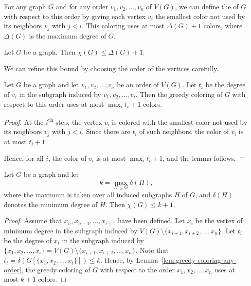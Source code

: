 For any graph \(G\) and for any order \(v_1, v_2, \ldots, v_n\) of \(V(G)\), we can define the  of \(G\) with respect to this order by giving each vertex \(v_i\) the smallest color not used by its neighbors \(v_j\) with \(j < i\).
This coloring uses at most \(\Delta(G) + 1\) colors,
where \(\Delta(G)\) is the maximum degree of \(G\).

\begin{proposition} \label{prop:greedy-coloring-delta-plus-one}
    Let \(G\) be a graph.
    Then \(\chi(G) \leq \Delta(G) + 1\).
\end{proposition}

We can refine this bound by choosing the order of the vertices carefully.

\begin{lemma} \label{lem:greedy-coloring-any-order}
    Let \(G\) be a graph and let \(v_1, v_2, \ldots, v_n\) be an order of \(V(G)\).
    Let \(t_i\) be the degree of \(v_i\) in the subgraph induced by \(v_1, v_2, \ldots, v_i\).
    Then the greedy coloring of \(G\) with respect to this order uses at most \(\max_i t_i + 1\) colors.
\end{lemma}

\begin{proof}
    At the \(i\)\textsuperscript{th} step,
    the vertex \(v_i\) is colored with the smallest color not used by its neighbors \(v_j\) with \(j < i\).
    Since there are \(t_i\) of such neighbors,
    the color of \(v_i\) is at most \(t_i + 1\).

    Hence, for all \(i\),
    the color of \(v_i\) is at most \(\max_i t_i + 1\),
    and the lemma follows.
\end{proof}

\begin{theorem} \label{thm:greedy-coloring-induced-subgraph}
    Let \(G\) be a graph and let
    \begin{equation}
        k = \max_{H \subseteq G} \delta(H),
    \end{equation}
    where the maximum is taken over all induced subgraphs \(H\) of \(G\),
    and \(\delta(H)\) denotes the minimum degree of \(H\).
    Then \(\chi(G) \leq k + 1\).
\end{theorem}

\begin{proof}
    Assume that \(x_n, x_{n - 1}, \ldots, x_{i+1}\) have been defined.
    Let \(x_i\) be the vertex of minimum degree in the subgraph induced by \(V(G) \setminus \{x_{i + 1}, x_{i + 2}, \ldots, x_n\}\).
    Let \(t_i\) be the degree of \(x_i\) in the subgraph induced by \(\{x_1, x_2, \ldots, x_i\} = V(G) \setminus \{x_{i + 1}, x_{i + 2}, \ldots, x_n\}\).
    Note that \(t_i = \delta(G[\{x_1, x_2, \ldots, x_i\}]) \leq k\).
    Hence, by Lemma~\ref{lem:greedy-coloring-any-order},
    the greedy coloring of \(G\) with respect to the order \(x_1, x_2, \ldots, x_n\) uses at most \(k + 1\) colors.
\end{proof}

